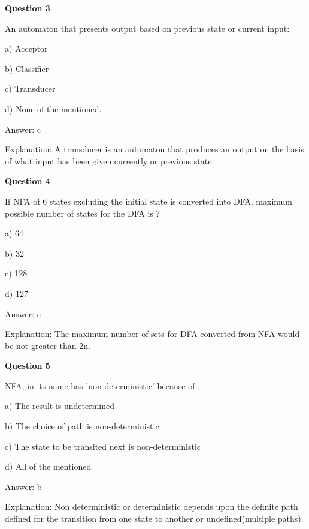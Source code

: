 \documentclass{article}
\begin{document}
\begin{mdframed}[linewidth=1pt, roundcorner=5pt, linecolor=gray!30, backgroundcolor=gray!5]
\textbf{Question 3} 

An automaton that presents output based on previous state or current input:

a) Acceptor

b) Classifier

c) Transducer

d) None of the mentioned.
\vspace{5pt} \par
\begin{tcolorbox}[colback=green!5, colframe=green!40!black, title=Solution]
Answer: c

Explanation: A transducer is an automaton that produces an output on the basis of what input has been given currently or previous state.
\end{tcolorbox}
\end{mdframed}
\newpage

\begin{mdframed}[linewidth=1pt, roundcorner=5pt, linecolor=gray!30, backgroundcolor=gray!5]
\textbf{Question 4} 

If NFA of 6 states excluding the initial state is converted into DFA, maximum possible number of states for the DFA is ?

a) 64

b) 32

c) 128

d) 127
\vspace{5pt} \par
\begin{tcolorbox}[colback=green!5, colframe=green!40!black, title=Solution]
Answer: c

Explanation: The maximum number of sets for DFA converted from NFA would be not greater than 2n.
\end{tcolorbox}
\end{mdframed}

\begin{mdframed}[linewidth=1pt, roundcorner=5pt, linecolor=gray!30, backgroundcolor=gray!5]
\textbf{Question 5} 

NFA, in its name has 'non-deterministic' because of :

a) The result is undetermined

b) The choice of path is non-deterministic

c) The state to be transited next is non-deterministic

d) All of the mentioned
\vspace{5pt} \par
\begin{tcolorbox}[colback=green!5, colframe=green!40!black, title=Solution]
Answer: b

Explanation: Non deterministic or deterministic depends upon the definite path defined for the transition from one state to another or undefined(multiple paths).

\end{tcolorbox}
\end{mdframed}
\end{document}
